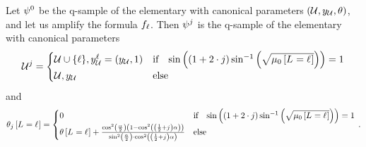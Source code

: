 \begin{lemma}
    \label{lem:rotationCanParamIncrease}
    Let $\psi^{0}$ be the q-sample of the elementary \ComputationActivationNetwork{} with canonical parameters $(\mathcal{U},y_{\mathcal{U}},\theta)$, and let us amplify the formula $f_{\ell}$.
    Then $\psi^{j}$ is the q-sample of the elementary \ComputationActivationNetwork{} with canonical parameters
    \begin{align*}
        \mathcal{U}^{j} =
        \begin{cases}
            \mathcal{U} \cup \{\ell\}, y_{\mathcal{U}}^{\ell}
            = (y_{\mathcal{U}},1) & \text{if}\quad \mathrm{sin}\left((1+2\cdot j)\sin^{-1}\left(\sqrt{\mu_{0}\left[L_{}=\ell_{}\right]}\right)\right) = 1 \\
            \mathcal{U}, y_{\mathcal{U}} & \text{else}
        \end{cases}
    \end{align*}
    and
    \begin{align*}
        \theta_{j}\left[L_{}=\ell_{}\right] =
        \begin{cases}
            0 & \text{if}\quad  \mathrm{sin}\left((1+2\cdot j)\sin^{-1}\left(\sqrt{\mu_{0}\left[L_{}=\ell_{}\right]}\right)\right) = 1 \\
            \theta\left[L_{}=\ell_{}\right] + \frac{
                \cos^2\left(\frac{\alpha}{2}\right) \left(1-
                                                                 \cos^2\left(\left(\frac{1}{2}+j\right) \alpha \right)
                \right)
            }{
                \sin^2\left(\frac{\alpha}{2}\right)
                \cdot \cos^2\left(\left(\frac{1}{2}+j\right)\alpha\right)
            } & \text{else}
        \end{cases} \, .
    \end{align*}
\end{lemma}

